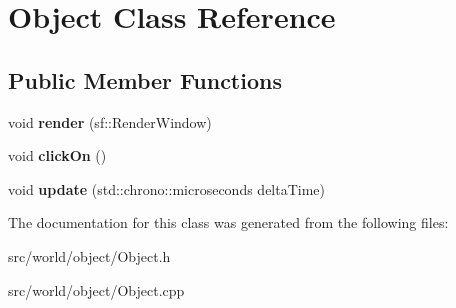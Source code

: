 \hypertarget{classObject}{\section{Object Class Reference}
\label{classObject}
}
\subsection*{Public Member Functions}
\begin{DoxyCompactItemize}
\item 
\hypertarget{classObject_a278a137fafd103884d923fd88c2845cc}{void {\bfseries render} (sf\-::\-Render\-Window)}\label{classObject_a278a137fafd103884d923fd88c2845cc}

\item 
\hypertarget{classObject_ac793c5c56ed16f0309f9eecf2e8e4413}{void {\bfseries click\-On} ()}\label{classObject_ac793c5c56ed16f0309f9eecf2e8e4413}

\item 
\hypertarget{classObject_a81f5c9c6f7806e6b1e13843f0848fdc6}{void {\bfseries update} (std\-::chrono\-::microseconds delta\-Time)}\label{classObject_a81f5c9c6f7806e6b1e13843f0848fdc6}

\end{DoxyCompactItemize}


The documentation for this class was generated from the following files\-:\begin{DoxyCompactItemize}
\item 
src/world/object/Object.\-h\item 
src/world/object/Object.\-cpp\end{DoxyCompactItemize}
